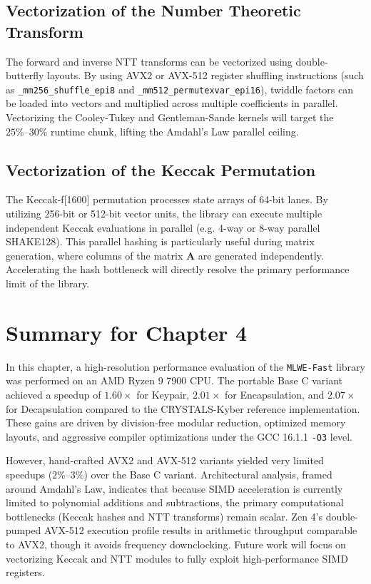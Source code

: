 \subsection{Vectorization of the Number Theoretic Transform}
\label{sub:future_ntt}
The forward and inverse NTT transforms can be vectorized using double-butterfly layouts. By using AVX2 or AVX-512 register shuffling instructions (such as \texttt{\_mm256\_}\allowbreak\texttt{shuffle\_}\allowbreak\texttt{epi8} and \texttt{\_mm512\_}\allowbreak\texttt{permutexvar\_}\allowbreak\texttt{epi16}), twiddle factors can be loaded into vectors and multiplied across multiple coefficients in parallel. Vectorizing the Cooley-Tukey and Gentleman-Sande kernels will target the $25\%\text{--}30\%$ runtime chunk, lifting the Amdahl's Law parallel ceiling.

\subsection{Vectorization of the Keccak Permutation}
\label{sub:future_keccak}
The Keccak-f[1600] permutation processes state arrays of 64-bit lanes. By utilizing 256-bit or 512-bit vector units, the library can execute multiple independent Keccak evaluations in parallel (e.g. 4-way or 8-way parallel SHAKE128). This parallel hashing is particularly useful during matrix generation, where columns of the matrix $\mathbf{A}$ are generated independently. Accelerating the hash bottleneck will directly resolve the primary performance limit of the library.

\section{Summary for Chapter 4}
\label{sec:bench_summary}

In this chapter, a high-resolution performance evaluation of the \texttt{MLWE-}\allowbreak\texttt{Fast} library was performed on an AMD Ryzen 9 7900 CPU. The portable Base C variant achieved a speedup of $1.60\times$ for Keypair, $2.01\times$ for Encapsulation, and $2.07\times$ for Decapsulation compared to the CRYSTALS-Kyber reference implementation. These gains are driven by division-free modular reduction, optimized memory layouts, and aggressive compiler optimizations under the GCC 16.1.1 \texttt{-O3} level.

However, hand-crafted AVX2 and AVX-512 variants yielded very limited speedups ($2\%\text{--}3\%$) over the Base C variant. Architectural analysis, framed around Amdahl's Law, indicates that because SIMD acceleration is currently limited to polynomial additions and subtractions, the primary computational bottlenecks (Keccak hashes and NTT transforms) remain scalar. Zen 4's double-pumped AVX-512 execution profile results in arithmetic throughput comparable to AVX2, though it avoids frequency downclocking. Future work will focus on vectorizing Keccak and NTT modules to fully exploit high-performance SIMD registers.
